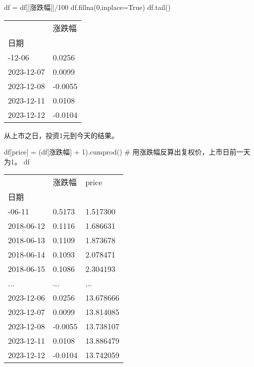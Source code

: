 \documentclass[
  letterpaper,
  DIV=11,
  numbers=noendperiod]{scrreprt}
\newenvironment{Shaded}{\begin{snugshade}}{\end{snugshade}}
\newcommand{\CommentTok}[1]{\textcolor[rgb]{0.37,0.37,0.37}{#1}}
\newcommand{\DecValTok}[1]{\textcolor[rgb]{0.68,0.00,0.00}{#1}}
\newcommand{\NormalTok}[1]{\textcolor[rgb]{0.00,0.23,0.31}{#1}}
\newcommand{\OperatorTok}[1]{\textcolor[rgb]{0.37,0.37,0.37}{#1}}
\newcommand{\StringTok}[1]{\textcolor[rgb]{0.13,0.47,0.30}{#1}}
\newcommand{\VariableTok}[1]{\textcolor[rgb]{0.07,0.07,0.07}{#1}}
\begin{document}
\begin{Shaded}
\begin{Highlighting}[]
\NormalTok{df }\OperatorTok{=}\NormalTok{ df[[}\StringTok{\textquotesingle{}涨跌幅\textquotesingle{}}\NormalTok{]]}\OperatorTok{/}\DecValTok{100}
\NormalTok{df.fillna(}\DecValTok{0}\NormalTok{,inplace}\OperatorTok{=}\VariableTok{True}\NormalTok{)}
\NormalTok{df.tail()}
\end{Highlighting}
\end{Shaded}

\begin{longtable}[]{@{}ll@{}}
\toprule\noalign{}
& 涨跌幅 \\
日期 & \\
\midrule\noalign{}
\endhead
\bottomrule\noalign{}
\endlastfoot
2023-12-06 & 0.0256 \\
2023-12-07 & 0.0099 \\
2023-12-08 & -0.0055 \\
2023-12-11 & 0.0108 \\
2023-12-12 & -0.0104 \\
\end{longtable}

从上市之日，投资1元到今天的结果。

\begin{Shaded}
\begin{Highlighting}[]
\NormalTok{df[}\StringTok{\textquotesingle{}price\textquotesingle{}}\NormalTok{] }\OperatorTok{=}\NormalTok{ (df[}\StringTok{\textquotesingle{}涨跌幅\textquotesingle{}}\NormalTok{] }\OperatorTok{+} \DecValTok{1}\NormalTok{).cumprod() }\CommentTok{\# 用涨跌幅反算出复权价，上市日前一天为1。}
\NormalTok{df}
\end{Highlighting}
\end{Shaded}

\begin{longtable}[]{@{}lll@{}}
\toprule\noalign{}
& 涨跌幅 & price \\
日期 & & \\
\midrule\noalign{}
\endhead
\bottomrule\noalign{}
\endlastfoot
2018-06-11 & 0.5173 & 1.517300 \\
2018-06-12 & 0.1116 & 1.686631 \\
2018-06-13 & 0.1109 & 1.873678 \\
2018-06-14 & 0.1093 & 2.078471 \\
2018-06-15 & 0.1086 & 2.304193 \\
... & ... & ... \\
2023-12-06 & 0.0256 & 13.678666 \\
2023-12-07 & 0.0099 & 13.814085 \\
2023-12-08 & -0.0055 & 13.738107 \\
2023-12-11 & 0.0108 & 13.886479 \\
2023-12-12 & -0.0104 & 13.742059 \\
\end{longtable}
\end{document}
